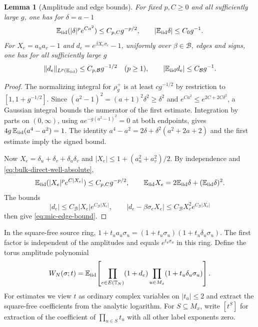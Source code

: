 \documentclass[11pt]{article}
\newcommand{\E}{\mathbb E}
\newtheorem{lemma}[proposition]{Lemma}
\theoremstyle{definition}
\begin{document}
\begin{lemma}[Amplitude and edge bounds]
\label{lem:amplitude-moments}
For fixed \(p,C\ge0\) and all sufficiently large \(g\), one has
for \(\delta=a-1\)
\begin{equation}
 \E_{\rm iid}(|\delta|^p e^{Ca^2})\le C_{p,C}g^{-p/2},
 \qquad |\E_{\rm iid}\delta|\le C_0 g^{-1}.
 \label{eq:bulk-direct-well-absolute}
\end{equation}
For \(X_e=a_ua_v-1\) and \(d_e=e^{\beta X_e\sigma_e}-1\),
uniformly over \(\beta\in\mathcal B\), edges and signs, one has for
all sufficiently large \(g\)
\begin{equation}
 \|d_e\|_{L^p(\E_{\rm iid})}\le C_{p,\mathcal B}g^{-1/2}\quad(p\ge1),
 \qquad |\E_{\rm iid} d_e|\le C_{\mathcal B} g^{-1}.
 \label{eq:mic-edge-bound}
\end{equation}
\end{lemma}

\begin{proof}
The normalizing integral for \(\rho_g^+\) is at least \(c g^{-1/2}\)
by restriction to \([1,1+g^{-1/2}]\). Since
\((a^2-1)^2=(a+1)^2\delta^2\ge\delta^2\) and
\(e^{Ca^2}\le e^{2C+2C\delta^2}\), a Gaussian integral bounds
the numerator of the first estimate. Integration by parts on
\((0,\infty)\), using \(a e^{-g(a^2-1)^2}=0\) at both endpoints,
gives \(4g\,\E_{\rm iid}(a^4-a^2)=1\).
The identity \(a^4-a^2=2\delta+\delta^2(a^2+2a+2)\) and the first
estimate imply the signed bound.

Now \(X_e=\delta_u+\delta_v+\delta_u\delta_v\) and
\(|X_e|\le1+(a_u^2+a_v^2)/2\).
By independence and \eqref{eq:bulk-direct-well-absolute},
\[
 \E_{\rm iid}(|X_e|^p e^{C|X_e|})\le C_{p,C}g^{-p/2},
 \qquad
 \E_{\rm iid}X_e=2\E_{\rm iid}\delta+(\E_{\rm iid}\delta)^2.
\]
The bounds
\[
 |d_e|\le C_{\mathcal B}|X_e|e^{C_{\mathcal B}|X_e|},\qquad
 |d_e-\beta\sigma_e X_e|\le C_{\mathcal B} X_e^2 e^{C_{\mathcal B}|X_e|}
\]
then give \eqref{eq:mic-edge-bound}.
\end{proof}

In the square-free source ring,
\(1+t_u a_u\sigma_u=(1+t_u\sigma_u)(1+t_u\delta_u\sigma_u)\).
The first factor is independent of the amplitudes and equals
\(e^{t_u\sigma_u}\) in this ring. Define the torus amplitude polynomial
\begin{equation}
 W_N(\sigma;t)=\E_{\rm iid}\!\left[
       \prod_{e\in E(\mathbb T_N)}(1+d_e)
       \prod_{u\in M_x}(1+t_u\delta_u\sigma_u)\right].
 \label{eq:bulk-direct-amplitude-generating}
\end{equation}
For estimates we view \(t\) as ordinary complex variables on
\(|t_u|\le2\) and extract the square-free coefficients from the
analytic logarithm. For \(S\subseteq M_x\), write \([t^S]\)
for extraction of the coefficient of \(\prod_{u\in S}t_u\)
with all other label exponents zero.
\end{document}
